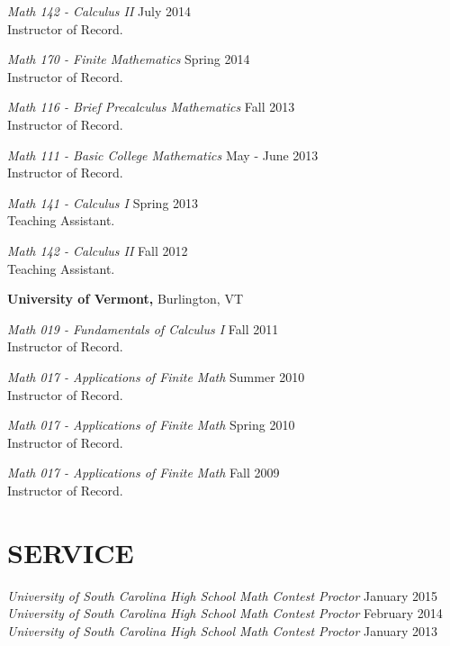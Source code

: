 \documentclass[line,overlapped]{res}
\begin{document}
\begin{resume}
                          {\sl Math 142 - Calculus II} \hfill July 2014\\
                          Instructor of Record.

                          {\sl Math 170 - Finite Mathematics} \hfill Spring 2014\\
                          Instructor of Record.

                          {\sl Math 116 - Brief Precalculus Mathematics} \hfill Fall 2013\\
                          Instructor of Record.
                          

                          {\sl Math 111 - Basic College Mathematics} \hfill May - June 2013\\
                          Instructor of Record.

                          {\sl Math 141 - Calculus I} \hfill Spring 2013\\
                          Teaching Assistant.

                          {\sl Math 142 - Calculus II} \hfill Fall 2012\\
                          Teaching Assistant.

                          {\bf University of Vermont,} Burlington, VT

                          {\sl Math 019 - Fundamentals of Calculus I} \hfill Fall 2011\\
                          Instructor of Record.

                          {\sl Math 017 - Applications of Finite Math} \hfill Summer 2010\\
                          Instructor of Record.

                          \newpage
                          
                          {\sl Math 017 - Applications of Finite Math} \hfill Spring 2010\\
                          Instructor of Record.

                          {\sl Math 017 - Applications of Finite Math} \hfill Fall 2009\\
                          Instructor of Record.
                          \section{SERVICE}

                          {\sl University of South Carolina High School Math Contest Proctor} \hfill January 2015\\
                          {\sl University of South Carolina High School Math Contest Proctor} \hfill February 2014\\
                          {\sl University of South Carolina High School Math Contest Proctor} \hfill January 2013
                          

\end{resume}
\end{document}
